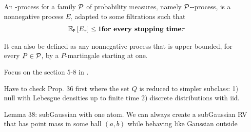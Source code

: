 \begin{define}
	An \E-process for a family $\mathcal{P}$ of probability measures, namely $\mathcal{P}$-\E-process,
	is a nonnegative process $E$, adapted to some filtrations such that
	\begin{align*}
		\ERWi{\Pt}{E_{\tau}} \leq 1 \qq{for every stopping time} \tau
	\end{align*}
\end{define}

It can also be defined as any nonnegative process that is upper bounded,
for every $P\in\mathcal{P}$, by a $P$-martingale starting at one.


Focus on the section 5-8 in \cite{ramdasAdmissibleAnytimevalidSequential2022}.

\begin{define}[Admissibiliy]

\end{define}

Have to check Prop. 36 first where the set $Q$ is reduced to simpler subclass:
1) null with Lebesgue densities up to finite time
2) discrete distributions with iid.

Lemma 38: subGaussian with one atom. We can always create a subGaussian
RV that has point mass in some ball $(a,b)$ while behaving like
Gaussian outside